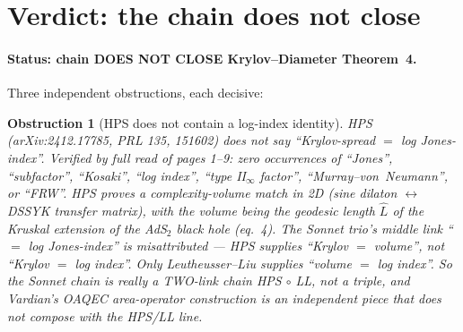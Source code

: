 \documentclass[11pt]{article}
\newtheorem{obstruction}{Obstruction}
\begin{document}
\section{Verdict: the chain does not close}\label{sec:verdict}

\paragraph{Status: chain DOES NOT CLOSE Krylov--Diameter Theorem~4.}
Three independent obstructions, each decisive:

\begin{obstruction}[HPS does not contain a log-index identity]\label{obs:T1}
HPS (arXiv:2412.17785, PRL 135, 151602) does not say
``Krylov-spread $=$ log Jones-index''. Verified by full read of pages 1--9: zero
occurrences of ``Jones'', ``subfactor'', ``Kosaki'', ``log index'', ``type
II$_\infty$ factor'', ``Murray--von~Neumann'', or ``FRW''. HPS proves a
\emph{complexity-volume} match in 2D (sine dilaton $\leftrightarrow$ DSSYK transfer
matrix), with the volume being the geodesic length $\hat L$ of the Kruskal extension
of the AdS$_2$ black hole (eq.~4). The Sonnet trio's middle link
``$=$ log Jones-index'' is misattributed --- HPS supplies ``Krylov $=$ volume'',
not ``Krylov $=$ log index''. Only Leutheusser--Liu supplies ``volume $=$ log
index''. So the Sonnet chain is really a TWO-link chain HPS $\circ$ LL, not a
triple, and Vardian's OAQEC area-operator construction is an independent piece
that does not compose with the HPS/LL line.
\end{obstruction}
\end{document}
